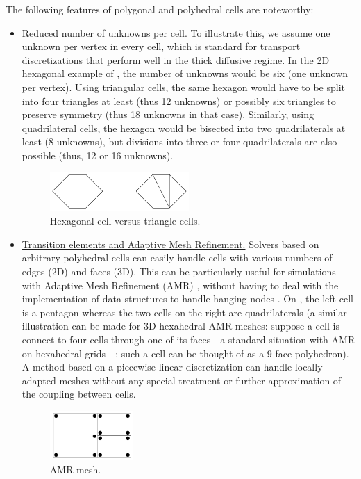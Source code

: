 The following features of polygonal and polyhedral cells are noteworthy:
\begin{itemize}
 \item \underline{Reduced number of unknowns per cell.} To illustrate this, we
   assume one unknown per vertex in every cell, which is standard for
   transport discretizations that perform well in the thick diffusive regime.
   In the 2D hexagonal example of , the number of
   unknowns would be six (one unknown per vertex). Using triangular cells, the
   same hexagon would have to be split into four triangles at least (thus 12
   unknowns) or possibly six triangles to preserve symmetry (thus 18 unknowns in
   that case). Similarly, using quadrilateral cells, the hexagon would be
   bisected into two quadrilaterals at least (8 unknowns), but divisions into
   three or four quadrilaterals are also possible (thus, 12 or 16 unknowns).
   \begin{figure}[H]
   \centering
   \includegraphics[width=0.5\textwidth]{hex_tri_cells}
   \caption{Hexagonal cell versus triangle cells.}
   \label{fig_hexa_split}
   \end{figure}
 \item \underline{Transition elements and Adaptive Mesh Refinement.} Solvers
   based on arbitrary polyhedral cells can easily handle cells with various
   numbers of edges (2D) and faces (3D). This can be particularly useful for
   simulations with Adaptive Mesh Refinement (AMR)
   \cite{amr_rad,amr_block,amr_unstruc}, without having to deal with the
   implementation of data structures to handle hanging nodes
   \cite{arbitrary_hanging_nodes,dealII_hanging_nodes,locally_hanging_nodes}.
   On , the left cell is a pentagon whereas the two cells on the right
   are quadrilaterals (a similar illustration can be made for 3D hexahedral
   AMR meshes: suppose a cell is connect to four cells through one of its faces
   - a standard situation with AMR on hexahedral grids - ; such a cell can be
   thought of as a 9-face polyhedron). A method based on a piecewise linear
   discretization can handle locally adapted meshes without any special
   treatment or further approximation of the coupling between cells.
   \begin{figure}[H]
   \centering
   \includegraphics[width=0.3\textwidth]{amr}
   \caption{AMR mesh.}
   \label{fig_amr}
   \end{figure}
\end{itemize}
